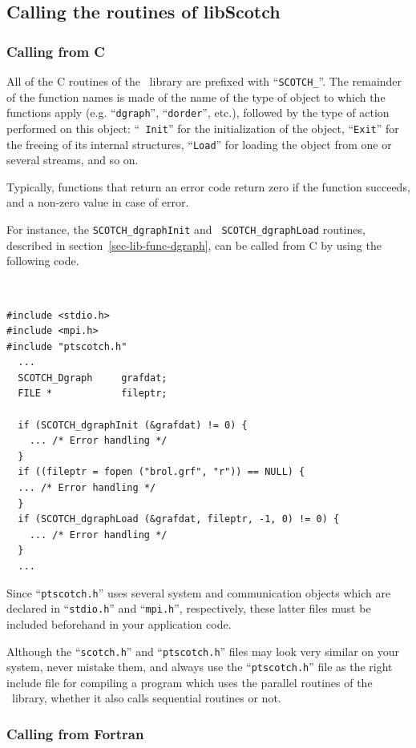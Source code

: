 \subsection{Calling the routines of {\sc libScotch}}

\subsubsection{Calling from C}

All of the C routines of the \libscotch\ library are prefixed with
``{\tt SCOTCH\_}''. The remainder of the function names is made of the
name of the type of object to which the functions apply (e\@.g\@.
``{\tt dgraph}'', ``{\tt dorder}'', etc.),
followed by the type of action performed on this object: ``{\tt
Init}'' for the initialization of the object, ``{\tt Exit}'' for the
freeing of its internal structures, ``{\tt Load}'' for loading the
object from one or several streams, and so on.

Typically, functions that return an error code return zero if the
function succeeds, and a non-zero value in case of error.

For instance, the {\tt SCOTCH\_\lbt dgraph\lbt Init} and {\tt
SCOTCH\_\lbt dgraph\lbt Load} routines, described in
section~\ref{sec-lib-func-dgraph}, can be called from C by using the
following code.
{\tt
\begin{verbatim}
#include <stdio.h>
#include <mpi.h>
#include "ptscotch.h"
  ...
  SCOTCH_Dgraph     grafdat;
  FILE *            fileptr;

  if (SCOTCH_dgraphInit (&grafdat) != 0) {
    ... /* Error handling */
  }
  if ((fileptr = fopen ("brol.grf", "r")) == NULL) {
  ... /* Error handling */
  }
  if (SCOTCH_dgraphLoad (&grafdat, fileptr, -1, 0) != 0) {
    ... /* Error handling */
  }
  ...
\end{verbatim}
}

Since ``{\tt ptscotch.h}'' uses several system and communication
objects which are declared in ``{\tt stdio.h}'' and ``{\tt mpi.h}'',
respectively, these latter files must be included beforehand
in your application code.

Although the ``{\tt scotch.h}'' and ``{\tt ptscotch.h}'' files may
look very similar on your system, never mistake them, and always use
the ``{\tt ptscotch.h}'' file as the right include file for compiling
a program which uses the parallel routines of the \libscotch\ library,
whether it also calls sequential routines or not.

\subsubsection{Calling from Fortran}

